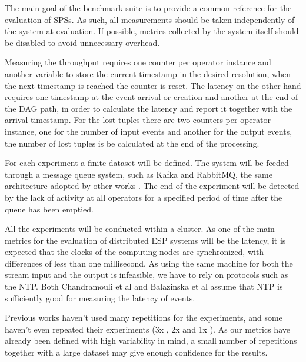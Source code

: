 \documentclass[ppgc,diss,english]{iiufrgs}
\begin{document}
%
%
%

The main goal of the benchmark suite is to provide a common reference for the evaluation of SPSs. As such, all measurements should be taken independently of the system at evaluation. If possible, metrics collected by the system itself should be disabled to avoid unnecessary overhead.

Measuring the throughput requires one counter per operator instance and another variable to store the current timestamp in the desired resolution, when the next timestamp is reached the counter is reset. The latency on the other hand requires one timestamp at the event arrival or creation and another at the end of the DAG path, in order to calculate the latency and report it together with the arrival timestamp. For the lost tuples there are two counters per operator instance, one for the number of input events and another for the output events, the number of lost tuples is be calculated at the end of the processing.

For each experiment a finite dataset will be defined. The system will be feeded through a message queue system, such as Kafka and RabbitMQ, the same architecture adopted by other works \cite{chardonnens2013big, lim2013execution, wang2013cluster, sawant2013big}. The end of the experiment will be detected by the lack of activity at all operators for a specified period of time after the queue has been emptied.

All the experiments will be conducted within a cluster. As one of the main metrics for the evaluation of distributed ESP systems will be the latency, it is expected that the clocks of the computing nodes are synchronized, with differences of less than one millisecond. As using the same machine for both the stream input and the output is infeasible, we have to rely on protocols such as the NTP. Both Chandramouli et al \cite{chandramouli2011accurate} and Balazinska et al \cite{balazinska2008fault} assume that NTP is sufficiently good for measuring the latency of events.

Previous works haven't used many repetitions for the experiments, and some haven't even repeated their experiments (3x \cite{dayarathna2013performance}, 2x \cite{mendes2009performance} and 1x \cite{de2011watershed}). As our metrics have already been defined with high variability in mind, a small number of repetitions together with a large dataset may give enough confidence for the results.
\end{document}
